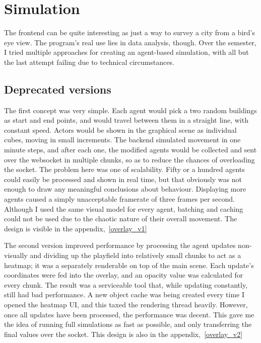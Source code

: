 \chapter{Simulation}

The frontend can be quite interesting as just a way to survey a city from a bird's eye view. The program's real use lies in data analysis, though. Over the semester, I tried multiple approaches for creating an agent-based simulation, with all but the last attempt failing due to technical circumstances.

\section{Deprecated versions}

The first concept was very simple. Each agent would pick a two random buildings as start and end points, and would travel between them in a straight line, with constant speed. Actors would be shown in the graphical scene as individual cubes, moving in small increments. The backend simulated movement in one minute steps, and after each one, the modified agents would be collected and sent over the websocket in multiple chunks, so as to reduce the chances of overloading the socket. The problem here was one of scalability. Fifty or a hundred agents could easily be processed and shown in real time, but that obviously was not enough to draw any meaningful conclusions about behaviour. Displaying more agents caused a simply unacceptable framerate of three frames per second. Although I used the same visual model for every agent, batching and caching could not be used due to the chaotic nature of their overall movement. The design is visible in the appendix,~\ref{overlay_v1}

The second version improved performance by processing the agent updates non-visually and dividing up the playfield into relatively small chunks to act as a heatmap; it was a separately renderable on top of the main scene. Each update's coordinates were fed into the overlay, and an opacity value was calculated for every chunk. The result was a serviceable tool that, while updating constantly, still had bad performance. A new object cache was being created every time I opened the heatmap UI, and this taxed the rendering thread heavily. However, once all updates have been processed, the performance was decent. This gave me the idea of running full simulations as fast as possible, and only transferring the final values over the socket. This design is also in the appendix,~\ref{overlay_v2}


